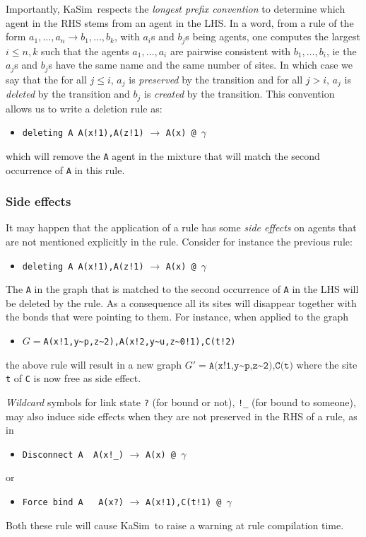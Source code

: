 \documentclass[11pt]{book}
\def\KaSim{\textsf{KaSim}}
\def\intstate{\textasciitilde}
\def\ttt#1{\texttt{#1}}
\def\rar{\rightarrow}
\def\ga{\gamma}
\def\ie{ie }
\def\ITE#1{\begin{itemize}#1\end{itemize}}
\begin{document}
Importantly, \KaSim~respects the \emph{longest prefix convention} to determine which agent in the RHS stems from an agent in the LHS. 
In a word, from a rule of the form $a_1,\dots,a_n\rar b_1,\dots,b_k$, with $a_i$s and $b_j$s being agents, one computes the largest $i\leq n,k$ such that the agents $a_1,\dots,a_i$ are pairwise consistent with $b_1,\dots,b_i$, \ie the $a_j$s and $b_j$s have the same name and the same number of sites. In which case we say that the for all $j\leq i$, $a_j$ is \emph{preserved} by the transition and for all $j>i$, $a_j$ is \emph{deleted} by the transition and $b_j$ is \emph{created} by the transition. This convention allows us to write a deletion rule as:
\ITE{
\item[] \ttt{{\textquotesingle}deleting A\textquotesingle\  A(x!1),A(z!1)} $\rar$ \ttt{A(x) @ $\ga$} 
}
which will remove the \ttt{A} agent in the mixture that will match the second occurrence of \ttt{A} in this rule.

\subsubsection*{Side effects}\label{sec:side-effect}

It may happen that the application of a rule has some \emph{side effects} on agents that are not mentioned explicitly in the rule. Consider for instance the previous rule:
\ITE{
\item[] \ttt{{\textquotesingle}deleting A{\textquotesingle} A(x!1),A(z!1)} $\rar$ \ttt{A(x) @ $\ga$} 
}
The \ttt{A} in the graph that is matched to the second occurrence of \ttt{A} in the LHS will be deleted by the rule. As a consequence all its sites will disappear together with the bonds that were pointing to them. For instance, when applied to the graph 
\ITE{
\item[] $G=$\ttt{A(x!1,y\intstate p,z\intstate2),A(x!2,y\intstate u,z\intstate0!1),C(t!2)}
} 
the above rule will result in a new graph $G' =\ttt{A(x!1,y{\intstate}p,z\intstate2),C(t)}$ where the site \ttt{t} of \ttt{C} is now free as side effect.

\emph{Wildcard} symbols for link state \ttt{?} (for bound or not), \ttt{!\_} (for bound to someone), may also induce side effects when they are not preserved in the RHS of a rule, as in
\ITE{
\item[] \ttt{{\textquotesingle}Disconnect A{\textquotesingle}~ A(x!\_)} $\rar$ \ttt{A(x) @ $\ga$} 
}
or 
\ITE{
\item[] \ttt{{\textquotesingle}Force bind A{\textquotesingle} ~ A(x?)} $\rar$ \ttt{A(x!1),C(t!1) @ $\ga$} 
}
Both these rule will cause \KaSim~to raise a warning at rule compilation time.
\end{document}
